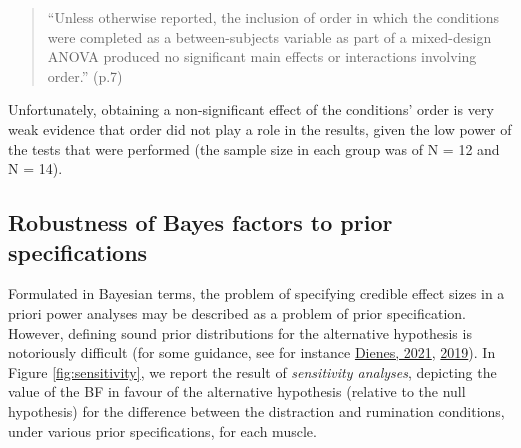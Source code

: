 \documentclass[
  english,
  man, donotrepeattitle,mask,floatsintext]{apa6}
\begin{document}
\begin{quote}
``Unless otherwise reported, the inclusion of order in which the conditions were completed as a between-subjects variable as part of a mixed-design ANOVA produced no significant main effects or interactions involving order.'' (p.7)
\end{quote}

Unfortunately, obtaining a non-significant effect of the conditions' order is very weak evidence that order did not play a role in the results, given the low power of the tests that were performed (the sample size in each group was of N = 12 and N = 14).

\hypertarget{robustness-of-bayes-factors-to-prior-specifications}{%
\subsection{Robustness of Bayes factors to prior specifications}\label{robustness-of-bayes-factors-to-prior-specifications}}

Formulated in Bayesian terms, the problem of specifying credible effect sizes in a priori power analyses may be described as a problem of prior specification. However, defining sound prior distributions for the alternative hypothesis is notoriously difficult (for some guidance, see for instance \protect\hyperlink{ref-dienes_obtaining_2021}{Dienes, 2021}, \protect\hyperlink{ref-dienes_how_2019}{2019}). In Figure \ref{fig:sensitivity}, we report the result of \emph{sensitivity analyses}, depicting the value of the BF in favour of the alternative hypothesis (relative to the null hypothesis) for the difference between the distraction and rumination conditions, under various prior specifications, for each muscle.
\end{document}
